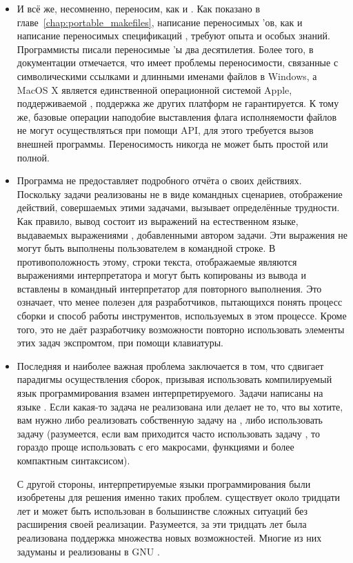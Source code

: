 \begin{itemize}
\item И всё же, несомненно,  переносим, как и \GNUmake{}.
Как показано в главе~\ref{chap:portable_makefiles}, написание
переносимых \Makefile{}'ов, как и написание переносимых спецификаций
, требуют опыта и особых знаний. Программисты писали
переносимые \Makefile{}'ы два десятилетия. Более того, в документации
 отмечается, что  имеет проблемы
переносимости, связанные с символическими ссылками \UNIX{} и длинными
именами файлов в Windows, а MacOS X является единственной операционной
системой Apple, поддерживаемой , поддержка же других
платформ не гарантируется. К тому же, базовые операции наподобие
выставления флага исполняемости файлов не могут осуществляться при
помощи \Java{} API, для этого требуется вызов внешней программы.
Переносимость никогда не может быть простой или полной.
\item Программа  не предоставляет подробного отчёта о
своих действиях. Поскольку задачи  реализованы не в виде
командных сценариев, отображение действий, совершаемых этими задачами,
вызывает определённые трудности. Как правило, вывод состоит из
выражений на естественном языке, выдаваемых выражениями
, добавленными автором задачи. Эти выражения не могут
быть выполнены пользователем в командной строке. В противоположность
этому, строки текста, отображаемые \GNUmake{} являются выражениями
интерпретатора и могут быть копированы из вывода и вставлены в
командный интерпретатор для повторного выполнения. Это означает, что
 менее полезен для разработчиков, пытающихся понять
процесс сборки и способ работы инструментов, используемых в этом
процессе. Кроме того, это не даёт разработчику возможности повторно
использовать элементы этих задач экспромтом, при помощи клавиатуры.
\item Последняя и наиболее важная проблема заключается в том, что
 сдвигает парадигмы осуществления сборок, призывая
использовать компилируемый язык программирования взамен
интерпретируемого. Задачи  написаны на языке \Java{}.
Если какая-то задача не реализована или делает не то, что вы хотите,
вам нужно либо реализовать собственную задачу на \Java{}, либо
использовать задачу  (разумеется, если вам приходится
часто использовать задачу , то гораздо проще
использовать \GNUmake{} с его макросами, функциями и более компактным
синтаксисом).

С другой стороны, интерпретируемые языки программирования были
изобретены для решения именно таких проблем. \GNUmake{} существует
около тридцати лет и может быть использован в большинстве сложных
ситуаций без расширения своей реализации. Разумеется, за эти тридцать
лет была реализована поддержка множества новых возможностей. Многие из
них задуманы и реализованы в GNU \GNUmake{}.
\end{itemize}

